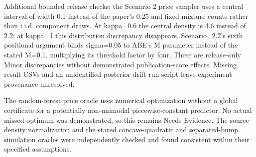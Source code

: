 \documentclass[10pt]{article}
\begin{document}
Additional bounded release checks: the Scenario 2 price sampler uses a central interval of width 0.1 instead of the paper’s 0.25 and fixed mixture counts rather than i.i.d. component draws. At kappa=0.6 the central density is 4.6 instead of 2.2; at kappa=1 this distribution discrepancy disappears. Scenario\_2.2’s sixth positional argument binds sigma=0.05 to ABE’s M parameter instead of the stated M=0.1, multiplying its threshold factor by four. These are release-only Minor discrepancies without demonstrated publication-score effects. Missing result CSVs and an unidentified posterior-drift run script leave experiment provenance unresolved.\par
The random-forest price oracle uses numerical optimization without a global certificate for a potentially non-unimodal piecewise-constant predictor. No actual missed optimum was demonstrated, so this remains Needs Evidence. The source density normalization and the stated concave-quadratic and separated-bump simulation oracles were independently checked and found consistent within their specified assumptions.\par
\end{document}
